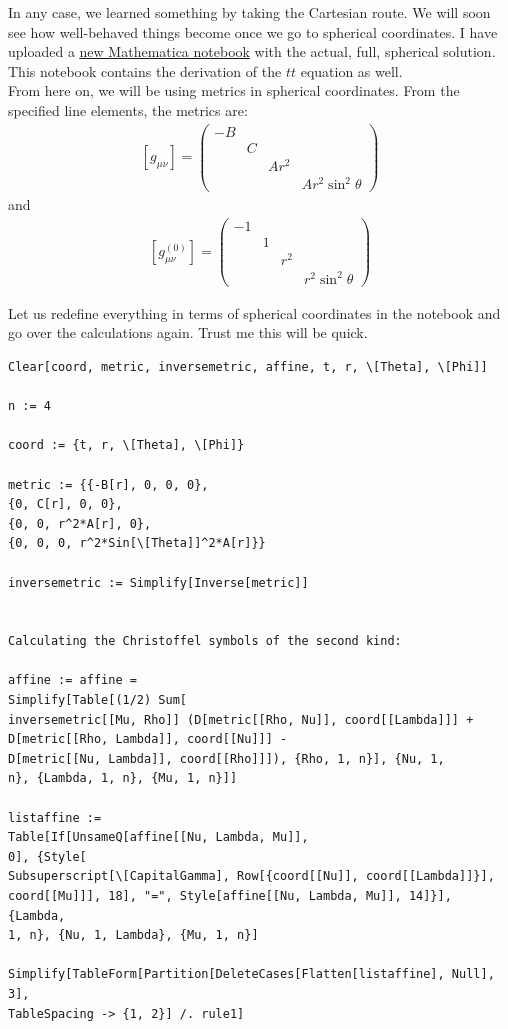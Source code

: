 \documentclass{book}
\theoremstyle{definition}
\begin{document}
In any case, we learned something by taking the Cartesian route. We will soon see how well-behaved things become once we go to spherical coordinates. I have uploaded a \href{https://huanqbui.com/LaTeX projects/HuanBui_QM/SphericalSolution_Vainshtein.nb}{\underline{new Mathematica notebook}} with the actual, full, spherical solution. This notebook contains the derivation of the $tt$ equation as well.  \\

From here on, we will be using metrics in spherical coordinates. From the specified line elements, the metrics are:
\begin{align}
\boxed{[g_{\mu\nu}] = \begin{pmatrix}
	-B &&&\\
	&C&&\\
	&&Ar^2&\\
	&&&Ar^2\sin^2\theta
	\end{pmatrix}}
\end{align}
and
\begin{align}
\boxed{[g^{(0)}_{\mu\nu}] = \begin{pmatrix}
	-1 &&&\\
	&1&&\\
	&&r^2&\\
	&&&r^2\sin^2\theta
	\end{pmatrix}}
\end{align}

Let us redefine everything in terms of spherical coordinates in the notebook and go over the calculations again. Trust me this will be quick.
\begin{lstlisting}
Clear[coord, metric, inversemetric, affine, t, r, \[Theta], \[Phi]]

n := 4

coord := {t, r, \[Theta], \[Phi]}

metric := {{-B[r], 0, 0, 0},
{0, C[r], 0, 0},
{0, 0, r^2*A[r], 0},
{0, 0, 0, r^2*Sin[\[Theta]]^2*A[r]}}

inversemetric := Simplify[Inverse[metric]]


Calculating the Christoffel symbols of the second kind: 

affine := affine = 
Simplify[Table[(1/2) Sum[
inversemetric[[Mu, Rho]] (D[metric[[Rho, Nu]], coord[[Lambda]]] + 
D[metric[[Rho, Lambda]], coord[[Nu]]] - 
D[metric[[Nu, Lambda]], coord[[Rho]]]), {Rho, 1, n}], {Nu, 1, 
n}, {Lambda, 1, n}, {Mu, 1, n}]]

listaffine := 
Table[If[UnsameQ[affine[[Nu, Lambda, Mu]], 
0], {Style[
Subsuperscript[\[CapitalGamma], Row[{coord[[Nu]], coord[[Lambda]]}], 
coord[[Mu]]], 18], "=", Style[affine[[Nu, Lambda, Mu]], 14]}], {Lambda, 
1, n}, {Nu, 1, Lambda}, {Mu, 1, n}]

Simplify[TableForm[Partition[DeleteCases[Flatten[listaffine], Null], 3], 
TableSpacing -> {1, 2}] /. rule1]
\end{lstlisting}
\end{document}
